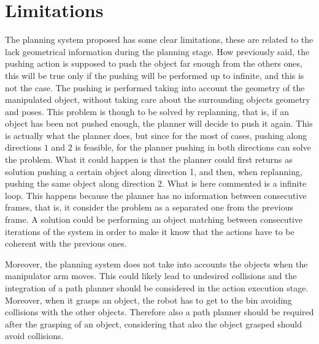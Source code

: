 \section*{Limitations}
The planning system proposed has some clear limitations, these are related to the lack geometrical information during the planning stage. 
How previously said, the pushing action is supposed to push the object far enough from the others ones, this will be true only if the pushing will be performed up to infinite, and this is not the case. The pushing is performed taking into account the geometry of the manipulated object, without taking care about the surrounding objects geometry and poses. This problem is though to be solved by replanning, that is, if an object has been not pushed enough, the planner will decide to push it again. This is actually what the planner does, but since for the most of cases, pushing along directions $1$ and $2$ is feasible, for the planner pushing in both directions can solve the problem. What it could happen is that the planner could first returns as solution pushing a certain object along direction 1, and then, when replanning, pushing the same object along direction 2. What is here commented is a infinite loop. This happens because the planner has no information between consecutive frames, that is, it consider the problem as a separated one from the previous frame. 
A solution could be performing an object matching between consecutive iterations of the system in order to make it know that the actions have to be coherent with the previous ones. 

Moreover, the planning system does not take into accounts the objects when the manipulator arm moves. This could likely lead to undesired collisions and the integration of a path planner should be considered in the action execution stage. Moreover, when it grasps an object, the robot has to get to the bin avoiding collisions with the other objects. Therefore also a path planner should be required after the grasping of an object, considering that also the object grasped should avoid collisions.

